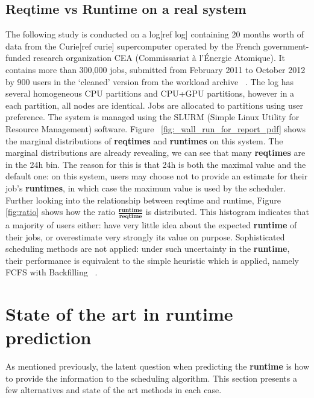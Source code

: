 \documentclass{article}
\begin{document}
\subsection{Reqtime vs Runtime on a real system}
\label{sub:reqtime_vs_runtime_on_a_real_system}
The following study is conducted on a log[ref log] containing 20 months worth of data from the Curie[ref curie] supercomputer operated by the French government-funded research organization CEA (Commissariat à l'Énergie Atomique).
It contains more than 300,000 jobs, submitted from February 2011 to October 2012 by 900 users in the `cleaned' version from the workload archive ~\cite{workloadarchive}.
The log has several homogeneous CPU partitions and CPU+GPU partitions, however in a each partition, all nodes are identical.
Jobs are allocated to partitions using user preference. The system is managed using the SLURM (Simple Linux Utility for Resource Management) software.
Figure ~\ref{fig:_wall_run_for_report_pdf} shows the marginal distributions of \textbf{reqtimes} and \textbf{runtimes} on this system. The marginal distributions are already revealing, we can see that many \textbf{reqtimes} are in the 24h bin.
The reason for this is that 24h is both the maximal value and the default one: on this system, users may choose not to provide an estimate for their job's \textbf{runtimes}, in which case the maximum value is used by the scheduler.
Further looking into the relationship between reqtime and runtime, Figure~ \ref{fig:ratio} shows how the ratio $\frac{\textbf{runtime}}{\textbf{reqtime}}$ is distributed. This histogram indicates that a majority of users either: have very little idea about the expected \textbf{runtime} of their jobs, or overestimate very strongly its value on purpose. Sophisticated scheduling methods are not applied: under such uncertainty in the \textbf{runtime},  their performance is equivalent to the simple heuristic which is applied, namely FCFS with Backfilling ~\cite{backfilling}.

\section{State of the art in \textbf{runtime} prediction}

As mentioned previously, the latent question when predicting the \textbf{runtime} is how to provide the information to the scheduling algorithm. This section presents a few alternatives and state of the art methods in each case.
\end{document}
